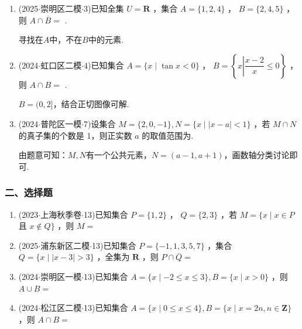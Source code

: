 \begin{enumerate}
    \item (2025$\cdot$崇明区二模$\cdot$3)已知全集 $U = \mathbf{R}$ ，集合 $A = \{ 1,2,4\}$ ， $B = \{ 2,4,5\}$ ，则 $A \cap  \overline{B} =$ .
    \begin{jieda}
        寻找在$A$中，不在$B$中的元素.
    \end{jieda}

    \item (2024$\cdot$虹口区二模$\cdot$4)已知集合 $A = \{ x \mid  \tan x < 0\}$ ， $B = \left\{  {x\left| {\dfrac{x - 2}{x} \leq  0}\right. }\right\}$ ，则 $A \cap  B =$ .
    \begin{jieda}
        $B = (0, 2]$，结合正切图像可解.
    \end{jieda}

    \item (2024$\cdot$普陀区一模$\cdot$7)设集合 $M = \{ 2,0, - 1\} ,N = \{ x \mid  \left| {x - a}\right|  < 1\}$ ，若 $M \cap  N$ 的真子集的个数是 1，则正实数 $a$ 的取值范围为.
    \begin{jieda}
        由题意可知：$M,N$有一个公共元素，$N = (a-1, a+1)$，画数轴分类讨论即可.
    \end{jieda}
\end{enumerate}
\subsubsection*{二、选择题}
\begin{enumerate}
    \item (2023$\cdot$上海秋季卷$\cdot$13)已知集合 $P = \{ 1,2\}$ ， $Q = \{ 2,3\}$ ，若 $M = \{ x \mid  x \in  P$ 且 $x \notin  Q\}$ ，则 $M =$ 
    \item (2025$\cdot$浦东新区二模$\cdot$13)已知集合 $P = \{  - 1,1,3,5,7\}$ ，集合 $Q = \{ x \mid  \left| {x - 3}\right|  > 3\}$ ，全集为 $\mathbf{R}$ ，则 $P \cap  \overline{Q} =$ 

    \item (2024$\cdot$崇明区一模$\cdot$13)已知集合 $A = \{ x \mid   - 2 \leq  x \leq  3\} ,B = \{ x \mid  x > 0\}$ ，则 $A \cup  B =$ 

    \item (2024$\cdot$松江区二模$\cdot$13)已知集合 $A = \{ x \mid  0 \leq  x \leq  4\} ,B = \{ x \mid  x = {2n},n \in  \mathbf{Z}\}$ ，则 $A \cap  B =$ 
\end{enumerate}
